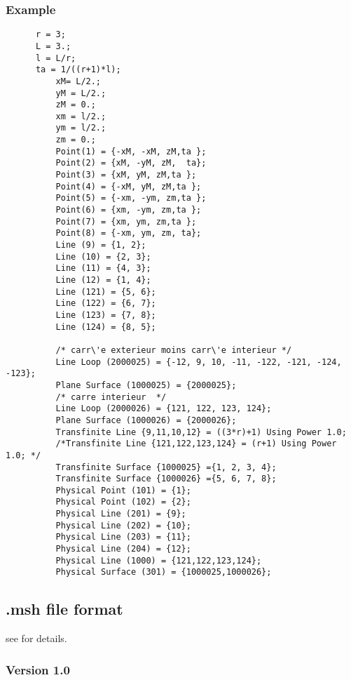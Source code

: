 \subsubsection{Example}
\begin{verbatim}
      r = 3;
      L = 3.;
      l = L/r;
      ta = 1/((r+1)*l);
	      xM= L/2.;
	      yM = L/2.;
	      zM = 0.;
	      xm = l/2.;
	      ym = l/2.;
	      zm = 0.;
	      Point(1) = {-xM, -xM, zM,ta };
	      Point(2) = {xM, -yM, zM,  ta};
	      Point(3) = {xM, yM, zM,ta };
	      Point(4) = {-xM, yM, zM,ta };
	      Point(5) = {-xm, -ym, zm,ta };
	      Point(6) = {xm, -ym, zm,ta };
	      Point(7) = {xm, ym, zm,ta };
	      Point(8) = {-xm, ym, zm, ta};
	      Line (9) = {1, 2};
	      Line (10) = {2, 3};
	      Line (11) = {4, 3};
	      Line (12) = {1, 4};
	      Line (121) = {5, 6};
	      Line (122) = {6, 7};
	      Line (123) = {7, 8};
	      Line (124) = {8, 5};
	
	      /* carr\'e exterieur moins carr\'e interieur */
	      Line Loop (2000025) = {-12, 9, 10, -11, -122, -121, -124, -123};
	      Plane Surface (1000025) = {2000025};
	      /* carre interieur  */
	      Line Loop (2000026) = {121, 122, 123, 124};
	      Plane Surface (1000026) = {2000026};
	      Transfinite Line {9,11,10,12} = ((3*r)+1) Using Power 1.0; 
	      /*Transfinite Line {121,122,123,124} = (r+1) Using Power 1.0; */
	      Transfinite Surface {1000025} ={1, 2, 3, 4};
	      Transfinite Surface {1000026} ={5, 6, 7, 8}; 
	      Physical Point (101) = {1};
	      Physical Point (102) = {2};
	      Physical Line (201) = {9};
	      Physical Line (202) = {10};
	      Physical Line (203) = {11};
	      Physical Line (204) = {12};
	      Physical Line (1000) = {121,122,123,124};
	      Physical Surface (301) = {1000025,1000026};
\end{verbatim}




\subsection{.msh file format}  \label{gmsh_msh}

see  for details.






\subsubsection{Version 1.0}

